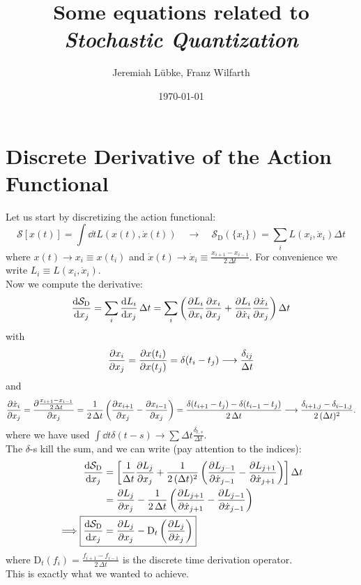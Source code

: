 \documentclass[11pt,a4paper]{scrartcl}
\title{Some equations related to \emph{Stochastic Quantization}}
\author{Jeremiah Lübke, Franz Wilfarth}
\date{\today}
\newcommand{\SD}{\ensuremath{\mathcal{S}_{\mathrm{D}}}}
\newcommand{\xdoti}{\ensuremath{\dot{x}_i}}
\newcommand{\xdotj}{\ensuremath{\dot{x}_j}}
\newcommand{\xdotjm}{\ensuremath{\dot{x}_{j-1}}}
\newcommand{\deltaij}{\ensuremath{\delta_{ij}}}
\newcommand{\OverDeltaT}[1]{\ensuremath{\frac{#1}{\Delta t}}}
\newcommand{\DT}{\ensuremath{\mathrm{D}_t}}
\newcommand{\OverTwoDeltaT}[1]{\ensuremath{\frac{#1}{2\, \Delta t}}}
\newcommand{\xdotjp}{\ensuremath{\dot{x}_{j+1}}}
\begin{document}
\maketitle

\section*{Discrete Derivative of the Action Functional}
Let us start by discretizing the action functional:
\begin{equation*}
    \mathcal{S}\left[x(t)\right] = \int\dd{t}L\left(x(t), \dot{x}(t)\right)
    \quad\longrightarrow\quad
    \SD\left(\{x_i\}\right) = \sum_i L\left(x_i, \xdoti\right)\Delta t
\end{equation*}
where $x(t) \longrightarrow x_i \equiv x(t_i)$ and $\dot{x}(t) \longrightarrow
\xdoti \equiv \OverTwoDeltaT{x_{i+1}-x_{i-1}}$. For convenience we write $L_i \equiv
L(x_i, \xdoti)$.\\

Now we compute the derivative:
\begin{equation*}
    \dv{\SD}{x_j} =\sum_i\dv{L_i}{x_j}\,\Delta t
    =\sum_i\left(\pdv{L_i}{x_i}\pdv{x_i}{x_j}+\pdv{L_i}{\xdoti}\pdv{\xdoti}{x_j}\right)
    \Delta t
\end{equation*}
with
\begin{equation*}
    \pdv{x_i}{x_j}=\pdv{x(t_i)}{x(t_j)}=\delta(t_i-t_j)\longrightarrow\OverDeltaT{\deltaij}
\end{equation*}
and
\begin{align*}
    \pdv{\xdoti}{x_j}=\pdv{\OverTwoDeltaT{x_{i+1}-x_{i-1}}}{x_j}
    =\OverTwoDeltaT{1}\left(\pdv{x_{i+1}}{x_j}-\pdv{x_{i-1}}{x_j}\right)
    =\OverTwoDeltaT{\delta(t_{i+1}-t_j)-\delta(t_{i-1}-t_j)}
    \longrightarrow\frac{\delta_{i+1,j}-\delta_{i-1,j}}{2\,(\Delta t)^2}.
\end{align*}
where we have used $\int\dd{t}\delta(t-s)\longrightarrow\sum\Delta{t}\frac{\delta_{t, s}}{\Delta{t}}$.\\

The $\delta$-s kill the sum, and we can write (pay attention to the indices):
\begin{align*}
    \dv{\SD}{x_j}&=\left[\OverDeltaT{1}\pdv{L_j}{x_j}+\frac{1}{2\,(\Delta{t})^2}
    \left(\pdv{L_{j-1}}{\xdotjm}-\pdv{L_{j+1}}{\xdotjp}\right)\right]\Delta{t}\\
    &=\pdv{L_j}{x_j}-\OverTwoDeltaT{1}\left(\pdv{L_{j+1}}{\xdotjp}-\pdv{L_{j-1}}{\xdotjm}\right)\\
    \implies\Aboxed{\dv{\SD}{x_j}&=\pdv{L_j}{x_j}-\DT\left(\pdv{L_{j}}{\xdotj}\right)}
\end{align*}
where $\DT(f_i)=\OverTwoDeltaT{f_{i+1}-f_{i-1}}$ is the discrete time derivation
operator.\\
This is exactly what we wanted to achieve.\\
\end{document}
